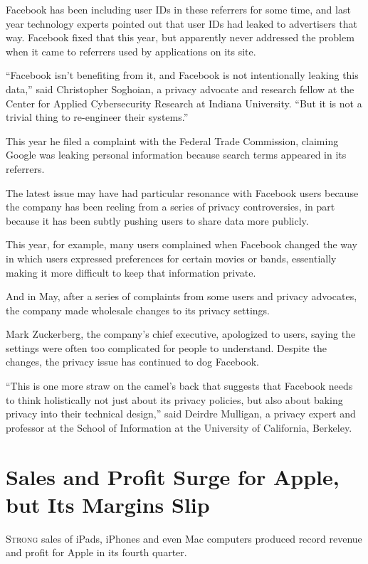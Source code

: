﻿\documentclass[12pt]{article}
\begin{document}
Facebook has been including user IDs in these referrers for some time, and last year technology
experts pointed out that user IDs had leaked to advertisers that way. Facebook fixed that this year,
but apparently never addressed the problem when it came to referrers used by applications on its
site.

``Facebook isn't benefiting from it, and Facebook is not intentionally leaking this data,'' said
Christopher Soghoian, a privacy advocate and research fellow at the Center for Applied Cybersecurity
Research at Indiana University. ``But it is not a trivial thing to re-engineer their systems.''

This year he filed a complaint with the Federal Trade Commission, claiming Google was leaking
personal information because search terms appeared in its referrers.

The latest issue may have had particular resonance with Facebook users because the company has been
reeling from a series of privacy controversies, in part because it has been subtly pushing users to
share data more publicly.

This year, for example, many users complained when Facebook changed the way in which users expressed
preferences for certain movies or bands, essentially making it more difficult to keep that
information private.

And in May, after a series of complaints from some users and privacy advocates, the company made
wholesale changes to its privacy settings.

Mark Zuckerberg, the company's chief executive, apologized to users, saying the settings were often
too complicated for people to understand. Despite the changes, the privacy issue has continued to
dog Facebook.

``This is one more straw on the camel's back that suggests that Facebook needs to think holistically
not just about its privacy policies, but also about baking privacy into their technical design,''
said Deirdre Mulligan, a privacy expert and professor at the School of Information at the University
of California, Berkeley.

\section{Sales and Profit Surge for Apple, but Its Margins Slip}

\lettrine{S}{trong} sales of iPads, iPhones and even Mac computers produced
record revenue and profit for Apple in its fourth quarter.
\end{document}
